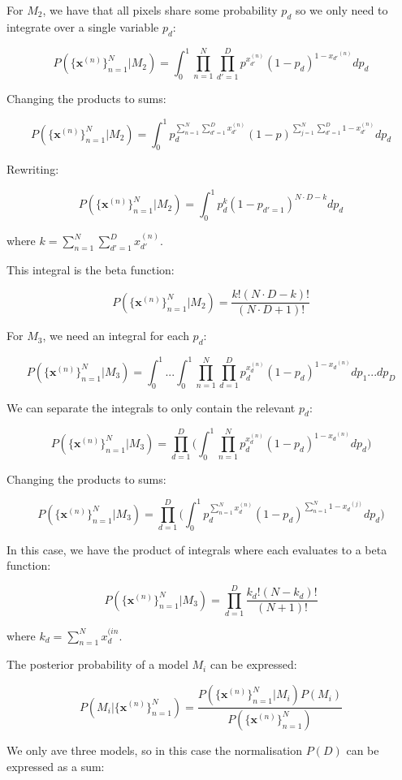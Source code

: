 \documentclass[12pt]{article}
\begin{document}
\begin{enumerate}
For $M_2$, we have that all pixels share some probability $p_d$ so we only need to integrate over a single variable $p_d$:

$$P( \{\textbf{x}^{(n)}\}_{n=1}^{N}|M_2) = \int_0^1 \prod_{n=1}^{N} \prod_{d'=1}^D p^{x_{d'}^{(n)}} (1-p_d)^{1-{x_{d'}}^{(n)}} dp_d$$

Changing the products to sums:

$$P( \{\textbf{x}^{(n)}\}_{n=1}^{N}|M_2) = \int_0^1  p_d^{\sum_{n=1}^{N} \sum_{d'=1}^D x_{d'}^{(n)}} (1-p)^{\sum_{j=1}^{N} \sum_{d'=1}^D 1-{x_{d'}^{(n)}}} d p_d$$

Rewriting:

$$P( \{\textbf{x}^{(n)}\}_{n=1}^{N}|M_2) = \int_0^1  p_d^{k} (1- p_{d'=1})^{N\cdot D-k} d p_d$$

where $k =\sum_{n=1}^{N} \sum_{d'=1}^D x_{d'}^{(n)}$.

This integral is the beta function:

$$P( \{\textbf{x}^{(n)}\}_{n=1}^{N}|M_2) = \frac{k! (N\cdot D-k)!}{(N\cdot D+1)!}$$

For $M_3$, we need an integral for each $p_d$:

$$P( \{\textbf{x}^{(n)}\}_{n=1}^{N}|M_3) = \int_0^1 ... \int_0^1 \prod_{n=1}^{N} \prod_{d=1}^D  p_d^{x_d^{(n)}} (1- p_d)^{1-{x_d}^{(n)}} d p_1 ... d p_D$$

We can separate the integrals to only contain the relevant $p_d$:

$$P( \{\textbf{x}^{(n)}\}_{n=1}^{N}|M_3) = \prod_{d=1}^D \Bigg( \int_0^1 \prod_{n=1}^{N}   p_d^{x_d^{(n)}} (1- p_d)^{1-{x_d}^{(n)}} d p_d \Bigg)$$

Changing the products to sums:

$$P( \{\textbf{x}^{(n)}\}_{n=1}^{N}|M_3) = \prod_{d=1}^D \Bigg( \int_0^1   p_d^{\sum_{n=1}^{N} x_d^{(n)}} (1- p_d)^{\sum_{n=1}^{N} 1-{x_d}^{(j)}} d p_d \Bigg)$$

In this case, we have the product of integrals where each evaluates to a beta function:

$$P( \{\textbf{x}^{(n)}\}_{n=1}^{N}|M_3) = \prod_{d=1}^D \frac{k_d! (N-k_d)!}{(N+1)!}$$

where $k_d = \sum_{n=1}^{N} x_d^{(in}$.

The posterior probability of a model $M_i$ can be expressed:

$$P(M_i |  \{\textbf{x}^{(n)}\}_{n=1}^{N}) = \frac{P( \{\textbf{x}^{(n)}\}_{n=1}^{N}|M_i)P(M_i)}{P( \{\textbf{x}^{(n)}\}_{n=1}^{N})}$$

We only ave three models, so in this case the normalisation $P(D)$ can be expressed as a sum:


\end{enumerate}
\end{document}
